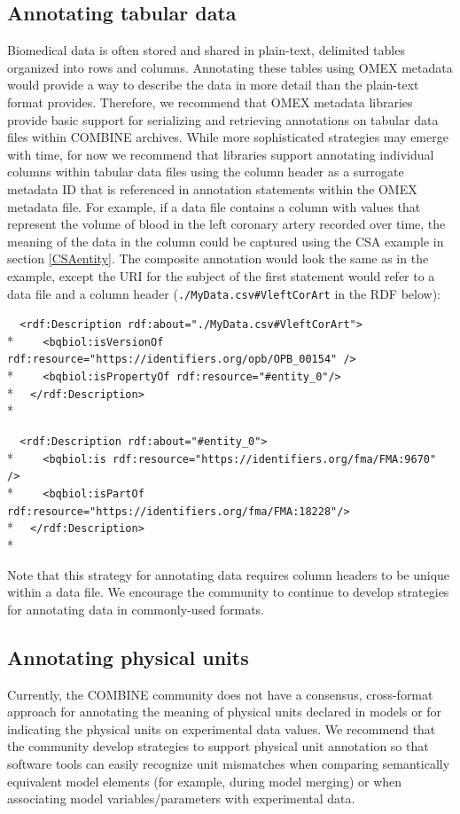 \documentclass[pdftex,rgb,dvipsnames,svgnames,hyperref,table]{report}
\begin{document}
\subsection{Annotating tabular data}
Biomedical data is often stored and shared in plain-text, delimited tables organized into rows and columns. Annotating these tables using OMEX metadata would provide a way to describe the data in more detail than the plain-text format provides. Therefore, we recommend that OMEX metadata libraries provide basic support for serializing and retrieving annotations on tabular data files within COMBINE archives. While more sophisticated strategies may emerge with time, for now we recommend that libraries support annotating individual columns within tabular data files using the column header as a surrogate metadata ID that is referenced in annotation statements within the OMEX metadata file. For example, if a data file contains a column with values that represent the volume of blood in the left coronary artery recorded over time, the meaning of the data in the column could be captured using the CSA example in section \ref{CSAentity}. The composite annotation would look the same as in the example, except the URI for the subject of the first statement would refer to a data file and a column header (\texttt{./MyData.csv\#VleftCorArt} in the RDF below):

  \verb|  <rdf:Description rdf:about="./MyData.csv#VleftCorArt">|\\*
  \verb|    <bqbiol:isVersionOf rdf:resource="https://identifiers.org/opb/OPB_00154" />|\\*
  \verb|    <bqbiol:isPropertyOf rdf:resource="#entity_0"/>|\\*
  \verb|  </rdf:Description>|\\*

  \verb|  <rdf:Description rdf:about="#entity_0">|\\*
  \verb|    <bqbiol:is rdf:resource="https://identifiers.org/fma/FMA:9670" />|\\*
  \verb|    <bqbiol:isPartOf rdf:resource="https://identifiers.org/fma/FMA:18228"/>|\\*
  \verb|  </rdf:Description>|\\*
  
Note that this strategy for annotating data requires column headers to be unique within a data file. We encourage the community to continue to develop strategies for annotating data in commonly-used formats.

\subsection{Annotating physical units}
Currently, the COMBINE community does not have a consensus, cross-format approach for annotating the meaning of physical units declared in models or for indicating the physical units on experimental data values. We recommend that the community develop strategies to support physical unit annotation so that software tools can easily recognize unit mismatches when comparing semantically equivalent model elements (for example, during model merging) or when associating model variables/parameters with experimental data.
\end{document}
